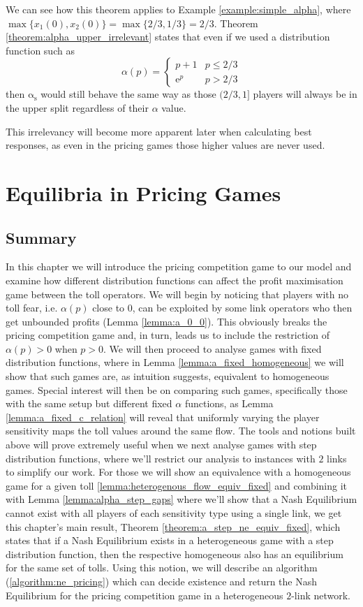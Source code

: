 \documentclass[10pt,a4paper]{book}
\newcommand{\as}{\mathrm{\alpha_s}}
\theoremstyle{definition}
\theoremstyle{comment}
\begin{document}
We can see how this theorem applies to Example \ref{example:simple_alpha}, where $\max\{x_1(0), x_2(0)\} = \max\{2/3, 1/3\} = 2/3$.
Theorem \ref{theorem:alpha_upper_irrelevant} states that even if we used a distribution function such as
\[
	\alpha(p) =
	\begin{cases}
		p + 1 & p \le 2/3 \\
		\mathrm{e}^p & p > 2/3
	\end{cases}
\]
then $\as$ would still behave the same way as those $(2/3, 1]$ players will always be in the upper split regardless of their $\alpha$ value.

This irrelevancy will become more apparent later when calculating best responses, as even in the pricing games those higher values are never used.

\cleardoublepage


\chapter{Equilibria in Pricing Games}
\label{chapter:pricing_equilibria}

\section*{Summary}

In this chapter we will introduce the pricing competition game to our model and examine how different distribution functions can affect the profit maximisation game between the toll operators.
We will begin by noticing that players with no toll fear, i.e. $\alpha(p)$ close to $0$, can be exploited by some link operators who then get unbounded profits (Lemma \ref{lemma:a_0_0}).
This obviously breaks the pricing competition game and, in turn, leads us to include the restriction of $\alpha(p) > 0$ when $p > 0$.
We will then proceed to analyse games with fixed distribution functions, where in Lemma \ref{lemma:a_fixed_homogeneous} we will show that such games are, as intuition suggests, equivalent to homogeneous games.
Special interest will then be on comparing such games, specifically those with the same setup but different fixed $\alpha$ functions, as Lemma \ref{lemma:a_fixed_c_relation} will reveal that uniformly varying the player sensitivity maps the toll values around the same flow.
The tools and notions built above will prove extremely useful when we next analyse games with step distribution functions, where we'll restrict our analysis to instances with $2$ links to simplify our work.
For those we will show an equivalence with a homogeneous game for a given toll \ref{lemma:heterogenous_flow_equiv_fixed} and combining it with Lemma \ref{lemma:alpha_step_gaps} where we'll show that a Nash Equilibrium cannot exist with all players of each sensitivity type using a single link, we get this chapter's main result, Theorem \ref{theorem:a_step_ne_equiv_fixed}, which states that if a Nash Equilibrium exists in a heterogeneous game with a step distribution function, then the respective homogeneous also has an equilibrium for the same set of tolls.
Using this notion, we will describe an algorithm (\ref{algorithm:ne_pricing}) which can decide existence and return the Nash Equilibrium for the pricing competition game in a heterogeneous $2$-link network.
\end{document}
